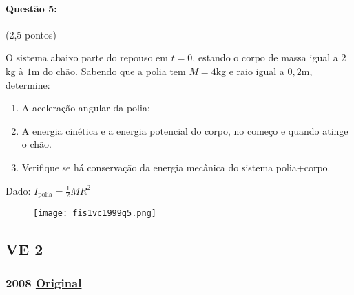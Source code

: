 \documentclass[12pt,a4paper]{article}
\newcommand{\original}[1]{\tiny \href{#1}{Original} \normalsize}
\begin{document}
\paragraph{Questão 5:} (2,5 pontos)

O sistema abaixo parte do repouso em $t=0$, estando o corpo de massa igual a $2$kg à $1$m do chão. 
Sabendo que a polia tem $M=4$kg e raio igual a $0,2$m, determine:

\begin{enumerate}[label=\alph*)]
\item A aceleração angular da polia;
\item A energia cinética e a energia potencial do corpo, no começo e quando atinge o chão.
\item Verifique se há conservação da energia mecânica do sistema polia+corpo.
\end{enumerate}

Dado: $I_{\textrm{polia}}=\frac{1}{2}MR^2$

\begin{figure}[ht]
\centering
\texttt{[image: fis1vc1999q5.png]}
\end{figure}

\newpage
\subsection{VE 2}

\subsubsection{2008 \original{https://drive.google.com/open?id=1G6WmRYX6Ozo_Ib6cQp9Km8oPaZ9l8lRp}}
\end{document}
